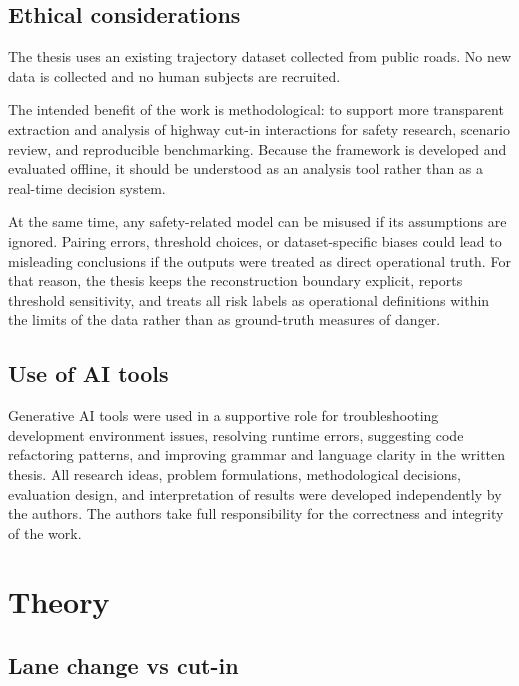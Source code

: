\documentclass[12pt,a4paper,twoside,openright]{report}
\begin{document}
    \section{Ethical considerations}
    The thesis uses an existing trajectory dataset collected from public roads. No new data is collected and no human subjects are recruited.

    The intended benefit of the work is methodological: to support more transparent extraction and analysis of highway cut-in interactions for safety research, scenario review, and reproducible benchmarking. Because the framework is developed and evaluated offline, it should be understood as an analysis tool rather than as a real-time decision system.

    At the same time, any safety-related model can be misused if its assumptions are ignored. Pairing errors, threshold choices, or dataset-specific biases could lead to misleading conclusions if the outputs were treated as direct operational truth. For that reason, the thesis keeps the reconstruction boundary explicit, reports threshold sensitivity, and treats all risk labels as operational definitions within the limits of the data rather than as ground-truth measures of danger.

    \section{Use of AI tools}
    Generative AI tools were used in a supportive role for troubleshooting development environment issues, resolving runtime errors, suggesting code refactoring patterns, and improving grammar and language clarity in the written thesis. All research ideas, problem formulations, methodological decisions, evaluation design, and interpretation of results were developed independently by the authors. The authors take full responsibility for the correctness and integrity of the work.

    \chapter{Theory}
    \label{chap:theory}

    \section{Lane change vs cut-in}
\end{document}
